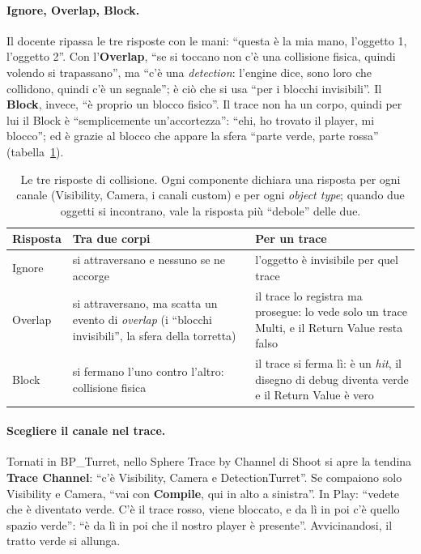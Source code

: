 \paragraph{Ignore, Overlap, Block.} Il docente ripassa le tre risposte con le mani:
``questa è la mia mano, l'oggetto 1, l'oggetto 2''. Con l'\textbf{Overlap}, ``se si
toccano non c'è una collisione fisica, quindi volendo si trapassano'', ma ``c'è una
\emph{detection}: l'engine dice, sono loro che collidono, quindi c'è un segnale''; è ciò
che si usa ``per i blocchi invisibili''. Il \textbf{Block}, invece, ``è proprio un
blocco fisico''. Il trace non ha un corpo, quindi per lui il Block è ``semplicemente
un'accortezza'': ``ehi, ho trovato il player, mi blocco''; ed è grazie al blocco che
appare la sfera ``parte verde, parte rossa'' (tabella~\ref{ue5:tab:risposte}).

\begin{table}[htbp]
\centering
\small
\begin{tabular}{@{}p{2.0cm}p{5.6cm}p{6.4cm}@{}}
\toprule
\textbf{Risposta} & \textbf{Tra due corpi} & \textbf{Per un trace} \\
\midrule
Ignore & si attraversano e nessuno se ne accorge & l'oggetto è invisibile per quel
trace \\
Overlap & si attraversano, ma scatta un evento di \emph{overlap} (i ``blocchi
invisibili'', la sfera della torretta) & il trace lo registra ma prosegue: lo vede solo
un trace Multi, e il Return Value resta falso \\
Block & si fermano l'uno contro l'altro: collisione fisica & il trace si ferma lì: è un
\emph{hit}, il disegno di debug diventa verde e il Return Value è vero \\
\bottomrule
\end{tabular}
\caption{Le tre risposte di collisione. Ogni componente dichiara una risposta per ogni
canale (Visibility, Camera, i canali custom) e per ogni \emph{object type}; quando due
oggetti si incontrano, vale la risposta più ``debole'' delle due.}
\label{ue5:tab:risposte}
\end{table}

\paragraph{Scegliere il canale nel trace.} Tornati in BP\_Turret, nello Sphere Trace by
Channel di Shoot si apre la tendina \textbf{Trace Channel}: ``c'è Visibility, Camera e
DetectionTurret''. Se compaiono solo Visibility e Camera, ``vai con \textbf{Compile},
qui in alto a sinistra''. In Play: ``vedete che è diventato verde. C'è il trace rosso,
viene bloccato, e da lì in poi c'è quello spazio verde'': ``è da lì in poi che il nostro
player è presente''. Avvicinandosi, il tratto verde si allunga.

